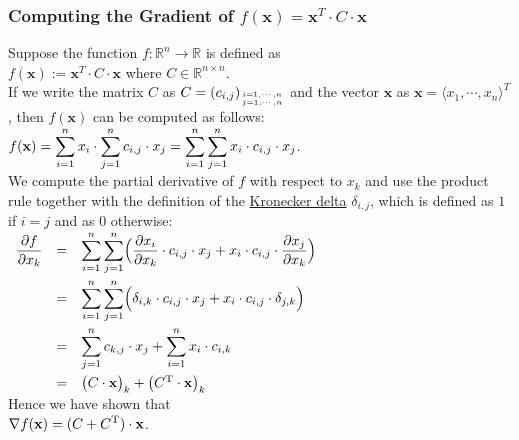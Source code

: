 \subsubsection{Computing the Gradient of $f(\mathbf{x}) = \mathbf{x}^T \cdot C \cdot \mathbf{x}$}
Suppose the function $f:\mathbb{R}^n \rightarrow \mathbb{R}$ is defined as
\\[0.2cm]
\hspace*{1.3cm}
$f(\mathbf{x}) := \mathbf{x}^T \cdot C \cdot \mathbf{x}$ \quad where $C \in \mathbb{R}^{n \times n}$.
\\[0.2cm]
If we write the matrix $C$ as $C = (c_{i,j})_{i=1,\cdots,n \atop j=1,\cdots,n}$ and the vector
$\mathbf{x}$ as $\mathbf{x} = \langle x_1, \cdots, x_n \rangle^T$,  then $f(\mathbf{x})$ can be
computed as follows:
\\[0.2cm]
\hspace*{1.3cm}
$\displaystyle f(\mathbf{x}) = \sum\limits_{i=1}^n x_i \cdot \sum\limits_{j=1}^n c_{i,j} \cdot x_j 
                   = \sum\limits_{i=1}^n \sum\limits_{j=1}^n x_i \cdot c_{i,j} \cdot x_j
$.
\\[0.2cm]
We compute the partial derivative of $f$ with respect to $x_k$ and use the product rule together with the
definition of the \href{https://en.wikipedia.org/wiki/Kronecker_delta}{Kronecker delta} $\delta_{i,j}$, which
is defined as $1$ if $i = j$ and as $0$ otherwise:
\\[0.2cm]
\hspace*{1.3cm}
$
\begin{array}[t]{lcl}
\displaystyle \frac{\partial f}{\partial x_k} & = &
\displaystyle \sum\limits_{i=1}^n \sum\limits_{j=1}^n \Bigl(
    \frac{\partial x_i}{\partial x_k} \cdot c_{i,j} \cdot x_j + x_i \cdot c_{i,j} \cdot \frac{\partial x_j}{\partial x_k}
    \Bigr) \\[0.5cm]
& = &
\displaystyle \sum\limits_{i=1}^n \sum\limits_{j=1}^n \Bigl(
    \delta_{i,k} \cdot c_{i,j} \cdot x_j + x_i \cdot c_{i,j} \cdot \delta_{j,k} \Bigr) \\[0.5cm]
& = &
\displaystyle \sum\limits_{j=1}^n c_{k,j} \cdot x_j + \sum\limits_{i=1}^n x_i \cdot c_{i,k} \\[0.5cm]
& = &
  \bigl(C \cdot \mathbf{x}\bigr)_k + \bigl(C^\textrm{T} \cdot \mathbf{x}\bigr)_k
\end{array}
$
\\[0.2cm]
Hence we have shown that 
\\[0.2cm]
\hspace*{1.3cm}
$\displaystyle \nabla f(\mathbf{x}) = (C + C^\textrm{T}) \cdot \mathbf{x}$.
\\[0.2cm]
